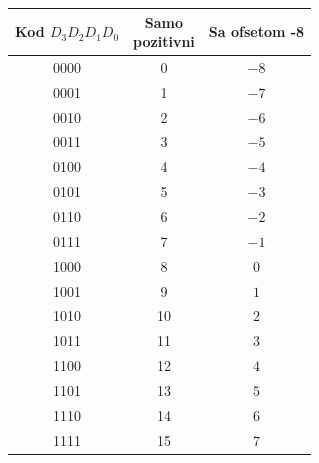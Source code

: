 \begin{tabular}{ccc}\toprule
\makecell{Kod\\$D_3 D_2 D_1 D_0$}&\makecell{Samo\\pozitivni}&Sa ofsetom -8\\\midrule
0000&0&$-8$\\
0001&1&$-7$\\
0010&2&$-6$\\
0011&3&$-5$\\
0100&4&$-4$\\
0101&5&$-3$\\
0110&6&$-2$\\
0111&7&$-1$\\
\midrule
1000&8&$0$\\
1001&9&$1$\\
1010&10&$2$\\
1011&11&$3$\\
1100&12&$4$\\
1101&13&$5$\\
1110&14&$6$\\
1111&15&$7$\\
\bottomrule\end{tabular}
